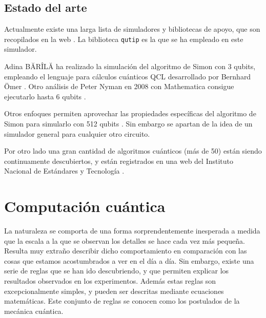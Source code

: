 \section{Estado del arte}
Actualmente existe una larga lista de simuladores y bibliotecas de apoyo, que 
son recopilados en la web \cite{quantiki}. La biblioteca \texttt{qutip} es la 
que se ha empleado en este simulador.

 
Adina BĂRÎLĂ \cite{adina} ha realizado la simulación del algoritmo de Simon con 
3 qubits, empleando el lenguaje para cálculos cuánticos QCL desarrollado por 
Bernhard Ömer \cite{qcl}. Otro análisis de Peter Nyman en 2008 con Mathematica 
consigue ejecutarlo hasta 6 qubits \cite{mathematica}.

Otros enfoques permiten aprovechar las propiedades específicas del algoritmo de 
Simon para simularlo con 512 qubits \cite{niklas}.  Sin embargo se apartan de la 
idea de un simulador general para cualquier otro circuito.

Por otro lado una gran cantidad de algoritmos cuánticos (más de 50) están siendo 
continuamente descubiertos, y están registrados en una web del Instituto 
Nacional de Estándares y Tecnología \cite{zoo}.

\chapter{Computación cuántica}




La naturaleza se comporta de una forma sorprendentemente inesperada a medida que 
la escala a la que se observan los detalles se hace cada vez más pequeña.  
Resulta muy extraño describir dicho comportamiento en comparación con las cosas 
que estamos acostumbrados a ver en el día a día. Sin embargo, existe una serie 
de reglas que se han ido descubriendo, y que permiten explicar los resultados 
observados en los experimentos. Además estas reglas son excepcionalmente 
simples, y pueden ser descritas mediante ecuaciones matemáticas. Este conjunto 
de reglas se conocen como los postulados de la mecánica cuántica.

